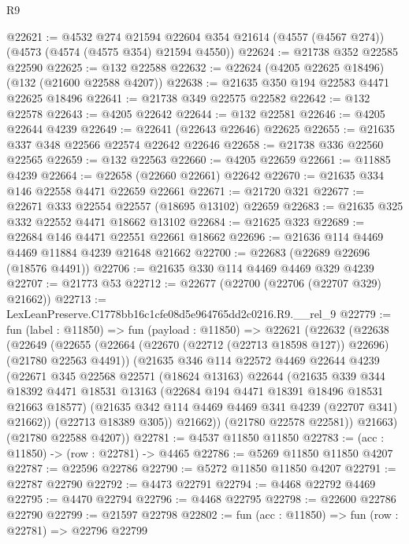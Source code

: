 \begin{lexlean}{R9}
\begin{coremodule}
@22621 := @4532
    @274
    @21594
    @22604
    @354
    @21614
    (@4557 (@4567 @274))
    (@4573 (@4574 (@4575 @354) @21594 @4550))
@22624 := @21738 @352 @22585 @22590
@22625 := @132 @22588
@22632 := @22624 (@4205 @22625 @18496) (@132 (@21600 @22588 @4207))
@22638 := @21635 @350 @194 @22583 @4471 @22625 @18496
@22641 := @21738 @349 @22575 @22582
@22642 := @132 @22578
@22643 := @4205 @22642
@22644 := @132 @22581
@22646 := @4205 @22644 @4239
@22649 := @22641 (@22643 @22646) @22625
@22655 := @21635 @337 @348 @22566 @22574 @22642 @22646
@22658 := @21738 @336 @22560 @22565
@22659 := @132 @22563
@22660 := @4205 @22659
@22661 := @11885 @4239
@22664 := @22658 (@22660 @22661) @22642
@22670 := @21635 @334 @146 @22558 @4471 @22659 @22661
@22671 := @21720 @321
@22677 := @22671 @333 @22554 @22557 (@18695 @13102) @22659
@22683 := @21635 @325 @332 @22552 @4471 @18662 @13102
@22684 := @21625 @323
@22689 := @22684 @146 @4471 @22551 @22661 @18662
@22696 := @21636 @114 @4469 @4469 @11884 @4239 @21648 @21662
@22700 := @22683 (@22689 @22696 (@18576 @4491))
@22706 := @21635 @330 @114 @4469 @4469 @329 @4239
@22707 := @21773 @53
@22712 := @22677 (@22700 (@22706 (@22707 @329) @21662))
@22713 := LexLeanPreserve.C1778bb16c1cfe08d5e964765dd2c0216.R9.__rel_9
@22779 := fun (label : @11850) =>
  fun (payload : @11850) =>
  @22621
    (@22632
      (@22638
        (@22649
          (@22655
            (@22664 (@22670 (@22712 (@22713 @18598 @127)) @22696) (@21780 @22563 @4491))
            (@21635
              @346
              @114
              @22572
              @4469
              @22644
              @4239
              (@22671
                @345
                @22568
                @22571
                (@18624 @13163)
                @22644
                (@21635
                  @339
                  @344
                  @18392
                  @4471
                  @18531
                  @13163
                  (@22684 @194 @4471 @18391 @18496 @18531 @21663 @18577)
                  (@21635 @342 @114 @4469 @4469 @341 @4239 (@22707 @341) @21662))
                (@22713 @18389 @305))
              @21662))
          (@21780 @22578 @22581))
        @21663)
      (@21780 @22588 @4207))
@22781 := @4537 @11850 @11850
@22783 := (acc : @11850) -> (row : @22781) -> @4465
@22786 := @5269 @11850 @11850 @4207
@22787 := @22596 @22786
@22790 := @5272 @11850 @11850 @4207
@22791 := @22787 @22790
@22792 := @4473 @22791
@22794 := @4468 @22792 @4469
@22795 := @4470 @22794
@22796 := @4468 @22795
@22798 := @22600 @22786 @22790
@22799 := @21597 @22798
@22802 := fun (acc : @11850) => fun (row : @22781) => @22796 @22799

\end{coremodule}
\end{lexlean}
